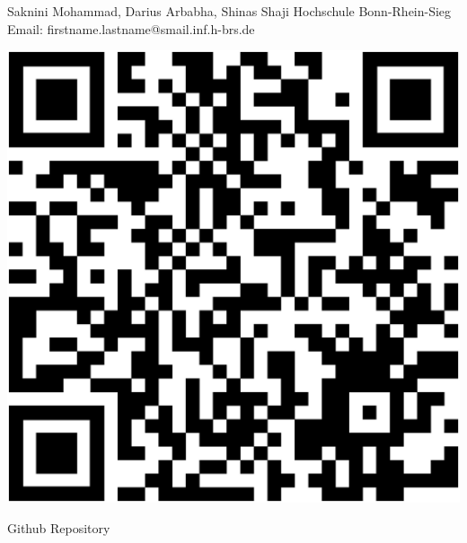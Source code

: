 

{
	\vspace*{1cm}
    \begin{minipage}{0.75\linewidth}
        \vspace*{-2.5cm}
        Saknini Mohammad, Darius Arbabha, Shinas Shaji\newline
        Hochschule Bonn-Rhein-Sieg\newline
        Email: firstname.lastname@smail.inf.h-brs.de\newline
    \end{minipage}
    \begin{minipage}{0.24\linewidth}
        \centering
        \vspace{-1.5cm}
        \begin{tikzfigure}
            \includegraphics[scale=0.125]{figures/qrcode.eps}
        \end{tikzfigure}
        Github Repository
    \end{minipage}
    \vspace*{-3cm}
    
}

